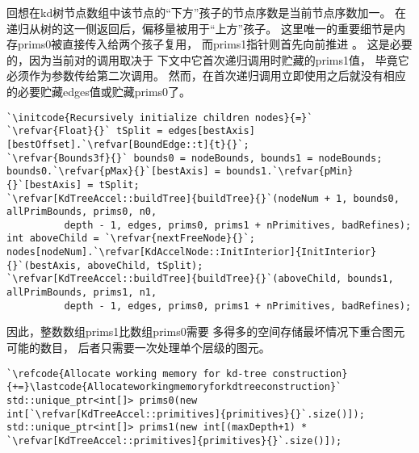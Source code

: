 回想在kd树节点数组中该节点的“下方”孩子的节点序数是当前节点序数加一。
在递归从树的这一侧返回后，偏移量被用于“上方”孩子。
这里唯一的重要细节是内存{\ttfamily prims0}被直接传入给两个孩子复用，
而{\ttfamily prims1}指针则首先向前推进
。
这是必要的，因为当前对的调用取决于
下文中它首次递归调用时贮藏的{\ttfamily prims1}值，
毕竟它必须作为参数传给第二次调用。
然而，在首次递归调用立即使用之后就没有相应的必要贮藏{\ttfamily edges}值或贮藏{\ttfamily prims0}了。
\begin{lstlisting}
`\initcode{Recursively initialize children nodes}{=}`
`\refvar{Float}{}` tSplit = edges[bestAxis][bestOffset].`\refvar[BoundEdge::t]{t}{}`;
`\refvar{Bounds3f}{}` bounds0 = nodeBounds, bounds1 = nodeBounds;
bounds0.`\refvar{pMax}{}`[bestAxis] = bounds1.`\refvar{pMin}{}`[bestAxis] = tSplit;
`\refvar[KdTreeAccel::buildTree]{buildTree}{}`(nodeNum + 1, bounds0, allPrimBounds, prims0, n0,
          depth - 1, edges, prims0, prims1 + nPrimitives, badRefines);
int aboveChild = `\refvar{nextFreeNode}{}`;
nodes[nodeNum].`\refvar[KdAccelNode::InitInterior]{InitInterior}{}`(bestAxis, aboveChild, tSplit);
`\refvar[KdTreeAccel::buildTree]{buildTree}{}`(aboveChild, bounds1, allPrimBounds, prims1, n1, 
          depth - 1, edges, prims0, prims1 + nPrimitives, badRefines);
\end{lstlisting}

因此，整数数组{\ttfamily prims1}比数组{\ttfamily prims0}需要
多得多的空间存储最坏情况下重合图元可能的数目，
后者只需要一次处理单个层级的图元。
\begin{lstlisting}
`\refcode{Allocate working memory for kd-tree construction}{+=}\lastcode{Allocateworkingmemoryforkdtreeconstruction}`
std::unique_ptr<int[]> prims0(new int[`\refvar[KdTreeAccel::primitives]{primitives}{}`.size()]);
std::unique_ptr<int[]> prims1(new int[(maxDepth+1) * `\refvar[KdTreeAccel::primitives]{primitives}{}`.size()]);
\end{lstlisting}

